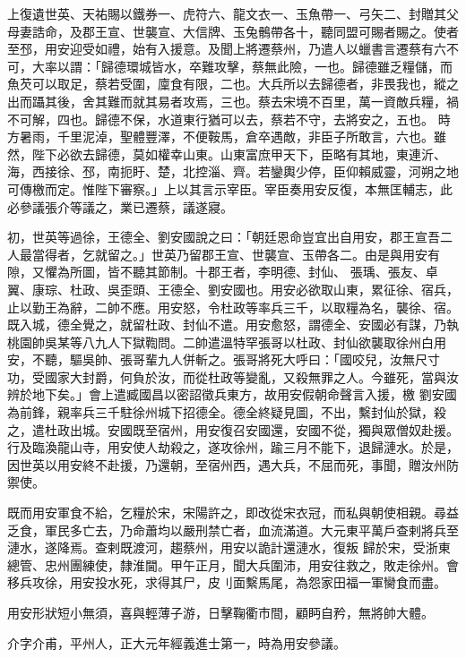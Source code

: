 \begin{pinyinscope}
 上復遺世英、天祐賜以鐵券一、虎符六、龍文衣一、玉魚帶一、弓矢二、封贈其父母妻誥命，及郡王宣、世襲宣、大信牌、玉兔鶻帶各十，聽同盟可賜者賜之。使者至邳，用安迎受如禮，始有入援意。及聞上將遷蔡州，乃遣人以蠟書言遷蔡有六不可，大率以謂：「歸德環城皆水，卒難攻擊，蔡無此險，一也。歸德雖乏糧儲，而魚芡可以取足，蔡若受圍，廩食有限，二也。大兵所以去歸德者，非畏我也，縱之出而躡其後，舍其難而就其易者攻焉，三也。蔡去宋境不百里，萬一資敵兵糧，禍不可解，四也。歸德不保，水道東行猶可以去，蔡若不守，去將安之，五也。
 時方暑雨，千里泥淖，聖體豐澤，不便鞍馬，倉卒遇敵，非臣子所敢言，六也。雖然，陛下必欲去歸德，莫如權幸山東。山東富庶甲天下，臣略有其地，東連沂、海，西接徐、邳，南扼盱、楚，北控淄、齊。若鑾輿少停，臣仰賴威靈，河朔之地可傳檄而定。惟陛下審察。」上以其言示宰臣。宰臣奏用安反復，本無匡輔志，此必參議張介等議之，業已遷蔡，議遂寢。



 初，世英等過徐，王德全、劉安國說之曰：「朝廷恩命豈宜出自用安，郡王宣吾二人最當得者，乞就留之。」世英乃留郡王宣、世襲宣、玉帶各二。由是與用安有隙，又懼為所圖，皆不聽其節制。十郡王者，李明德、封仙、
 張瑀、張友、卓翼、康琮、杜政、吳歪頭、王德全、劉安國也。用安必欲取山東，累征徐、宿兵，止以勤王為辭，二帥不應。用安怒，令杜政等率兵三千，以取糧為名，襲徐、宿。既入城，德全覺之，就留杜政、封仙不遣。用安愈怒，謂德全、安國必有謀，乃執桃園帥吳某等八九人下獄鞫問。二帥遣溫特罕張哥以杜政、封仙欲襲取徐州白用安，不聽，驅吳帥、張哥輩九人併斬之。張哥將死大呼曰：「國咬兒，汝無尺寸功，受國家大封爵，何負於汝，而從杜政等變亂，又殺無罪之人。今雖死，當與汝辨於地下矣。」會上遣臧國昌以密詔徵兵東方，故用安假朝命聲言入援，檄
 劉安國為前鋒，親率兵三千駐徐州城下招德全。德全終疑見圖，不出，繫封仙於獄，殺之，遣杜政出城。安國既至宿州，用安復召安國還，安國不從，獨與眾僧奴赴援。行及臨渙龍山寺，用安使人劫殺之，遂攻徐州，踰三月不能下，退歸漣水。於是，因世英以用安終不赴援，乃還朝，至宿州西，遇大兵，不屈而死，事聞，贈汝州防禦使。



 既而用安軍食不給，乞糧於宋，宋陽許之，即改從宋衣冠，而私與朝使相親。尋益乏食，軍民多亡去，乃命蕭均以嚴刑禁亡者，血流滿道。大元東平萬戶查剌將兵至漣水，遂降焉。查剌既渡河，趨蔡州，用安以詭計還漣水，復叛
 歸於宋，受浙東總管、忠州團練使，隸淮閫。甲午正月，聞大兵圍沛，用安往救之，敗走徐州。會移兵攻徐，用安投水死，求得其尸，皮刂面繫馬尾，為怨家田福一軍臠食而盡。



 用安形狀短小無須，喜與輕薄子游，日擊鞠衢市間，顧眄自矜，無將帥大體。



 介字介甫，平州人，正大元年經義進士第一，時為用安參議。




\end{pinyinscope}
